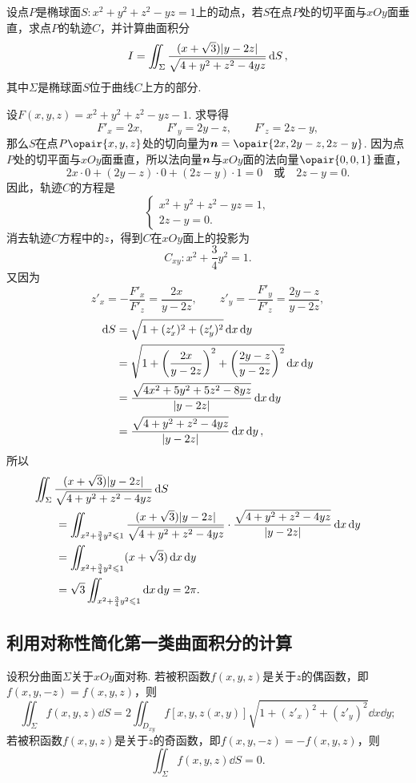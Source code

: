 \begin{example}
设点\(P\)是椭球面\(S: x^2 + y^2 + z^2 - yz = 1\)上的动点，若\(S\)在点\(P\)处的切平面与\(xOy\)面垂直，求点\(P\)的轨迹\(C\)，并计算曲面积分\[
I = \iint_{\Sigma} \frac{(x+\sqrt{3}) \abs{y-2z}}{\sqrt{4+y^2+z^2-4yz}} \dd{S},
\]其中\(\Sigma\)是椭球面\(S\)位于曲线\(C\)上方的部分.
\begin{solution}
设\(F(x,y,z) = x^2 + y^2 + z^2 - yz - 1\).
求导得\[
F'_x = 2x, \qquad
F'_y = 2y - z, \qquad
F'_z = 2z - y,
\]那么\(S\)在点\(P\opair{x,y,z}\)处的切向量为\(\mat{n} = \opair{2x,2y-z,2z-y}\).
因为点\(P\)处的切平面与\(xOy\)面垂直，所以法向量\(\boldsymbol{n}\)与\(xOy\)面的法向量\(\opair{0,0,1}\)垂直，\[
2x\cdot0 + (2y-z)\cdot0+(2z-y)\cdot1=0
\quad\text{或}\quad
2z-y=0.
\]因此，轨迹\(C\)的方程是\[
\begin{cases}
x^2 + y^2 + z^2 - yz = 1, \\
2z-y=0.
\end{cases}
\]消去轨迹\(C\)方程中的\(z\)，得到\(C\)在\(xOy\)面上的投影为\[
C_{xy}: x^2+\frac{3}{4}y^2=1.
\]又因为\[
z'_x = - \frac{F'_x}{F'_z} = \frac{2x}{y-2z}, \qquad
z'_y = - \frac{F'_y}{F'_z} = \frac{2y-z}{y-2z},
\]\begin{align*}
\dd{S} &= \sqrt{1+(z'_x)^2+(z'_y)^2} \dd{x}\dd{y} \\
&= \sqrt{1+\left(\frac{2x}{y-2z}\right)^2+\left(\frac{2y-z}{y-2z}\right)^2} \dd{x}\dd{y} \\
&= \frac{\sqrt{4x^2+5y^2+5z^2-8yz}}{\abs{y-2z}} \dd{x}\dd{y} \\
&= \frac{\sqrt{4+y^2+z^2-4yz}}{\abs{y-2z}} \dd{x}\dd{y},
\end{align*}所以\begin{align*}
&\hspace{-20pt}
\iint_{\Sigma} \frac{(x+\sqrt{3}) \abs{y-2z}}{\sqrt{4+y^2+z^2-4yz}} \dd{S} \\
&= \iint_{x^2+\frac{3}{4}y^2\leqslant1} \frac{(x+\sqrt{3}) \abs{y-2z}}{\sqrt{4+y^2+z^2-4yz}} \cdot \frac{\sqrt{4+y^2+z^2-4yz}}{\abs{y-2z}} \dd{x}\dd{y} \\
&= \iint_{x^2+\frac{3}{4}y^2\leqslant1} (x+\sqrt{3}) \dd{x}\dd{y} \\
&= \sqrt{3} \iint_{x^2+\frac{3}{4}y^2\leqslant1} \dd{x}\dd{y}
= 2\pi.
\end{align*}
\end{solution}
\end{example}

\subsection{利用对称性简化第一类曲面积分的计算}
设积分曲面\(\Sigma\)关于\(xOy\)面对称.
若被积函数\(f(x,y,z)\)是关于\(z\)的偶函数，即\(f(x,y,-z) = f(x,y,z)\)，则\[
\iint_{\Sigma} f(x,y,z) \dd{S} = 2 \iint_{D_{xy}} f[x,y,z(x,y)] \sqrt{1+(z'_x)^2+(z'_y)^2} \dd{x}\dd{y};
\]若被积函数\(f(x,y,z)\)是关于\(z\)的奇函数，即\(f(x,y,-z) = -f(x,y,z)\)，则\[
\iint_{\Sigma} f(x,y,z) \dd{S} = 0.
\]

